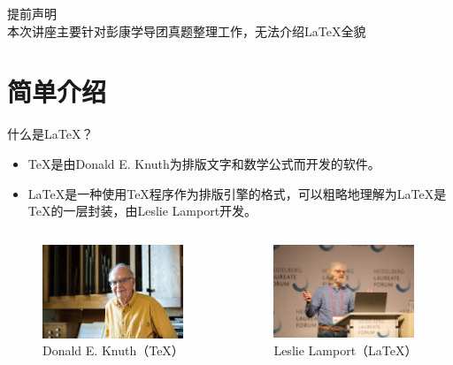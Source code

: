 \begin{frame}[standout]
  \huge 提前声明 \\[1ex]
  \footnotesize 本次讲座主要针对彭康学导团真题整理工作，无法介绍\LaTeX{}全貌
\end{frame}

\section{简单介绍}

\begin{frame}{什么是\LaTeX ？}
  \begin{itemize}
    \item \TeX 是由Donald E. Knuth为排版文字和数学公式而开发的软件。
    \item \LaTeX 是一种使用\TeX 程序作为排版引擎的格式，可以粗略地理解为\LaTeX 是\TeX 的一层封装，由Leslie Lamport开发。
  \end{itemize}
  \begin{columns}
    \begin{column}{0.45\textwidth}
      \begin{figure}
        \centering
        \includegraphics[height=2.8cm]{figures/Knuth-vivian20181019E.jpg}
        \caption{Donald E. Knuth（\TeX）}
      \end{figure}
    \end{column}
    \begin{column}{0.45\textwidth}
      \begin{figure}
        \centering
        \includegraphics[height=2.8cm]{figures/lamport-2018.jpg}
        \caption{Leslie Lamport（\LaTeX）}
      \end{figure}
    \end{column}
  \end{columns}
\end{frame}

